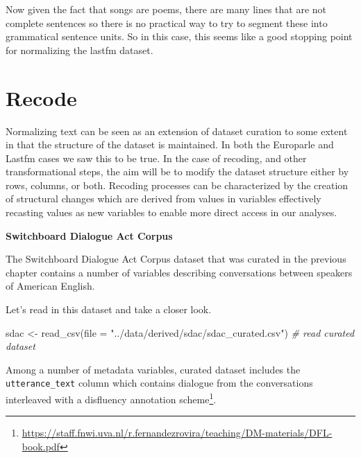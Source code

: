 \documentclass[
  letterpaper,
]{latex/krantz}
\newenvironment{Shaded}{\begin{snugshade}}{\end{snugshade}}
\newcommand{\AttributeTok}[1]{\textcolor[rgb]{0.00,0.00,0.00}{#1}}
\newcommand{\CommentTok}[1]{\textcolor[rgb]{0.00,0.00,0.00}{\textit{#1}}}
\newcommand{\FunctionTok}[1]{\textcolor[rgb]{0.00,0.00,0.00}{#1}}
\newcommand{\NormalTok}[1]{\textcolor[rgb]{0.00,0.00,0.00}{#1}}
\newcommand{\OtherTok}[1]{\textcolor[rgb]{0.00,0.00,0.00}{#1}}
\newcommand{\StringTok}[1]{\textcolor[rgb]{0.00,0.00,0.00}{#1}}
\DeclareRobustCommand{\href}[2]{#2\footnote{\url{#1}}}
\begin{document}
Now given the fact that songs are poems, there are many lines that are
not complete sentences so there is no practical way to try to segment
these into grammatical sentence units. So in this case, this seems like
a good stopping point for normalizing the lastfm dataset.

\hypertarget{td-recode}{%
\section{Recode}\label{td-recode}}

Normalizing text can be seen as an extension of dataset curation to some
extent in that the structure of the dataset is maintained. In both the
Europarle and Lastfm cases we saw this to be true. In the case of
recoding, and other transformational steps, the aim will be to modify
the dataset structure either by rows, columns, or both. Recoding
processes can be characterized by the creation of structural changes
which are derived from values in variables effectively recasting values
as new variables to enable more direct access in our analyses.

\textbf{Switchboard Dialogue Act Corpus}

The Switchboard Dialogue Act Corpus dataset that was curated in the
previous chapter contains a number of variables describing conversations
between speakers of American English.

Let's read in this dataset and take a closer look.

\begin{Shaded}
\begin{Highlighting}[]
\NormalTok{sdac }\OtherTok{\textless{}{-}} \FunctionTok{read\_csv}\NormalTok{(}\AttributeTok{file =} \StringTok{"../data/derived/sdac/sdac\_curated.csv"}\NormalTok{) }\CommentTok{\# read curated dataset}
\end{Highlighting}
\end{Shaded}

Among a number of metadata variables, curated dataset includes the
\texttt{utterance\_text} column which contains dialogue from the
conversations interleaved with a
\href{https://staff.fnwi.uva.nl/r.fernandezrovira/teaching/DM-materials/DFL-book.pdf}{disfluency
annotation scheme}.
\end{document}
